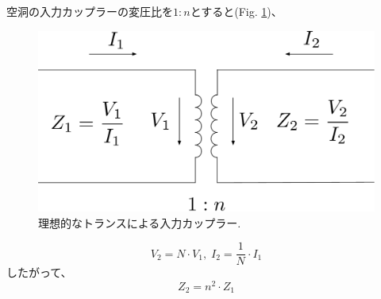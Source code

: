 \documentclass[book]{jlreq}
\begin{document}
空洞の入力カップラーの変圧比を$1:n$とすると(Fig. \ref{fig:Ideal_Trans})、
%
\begin{figure}[hbt]
    \begin{center}
        \includegraphics[width=12cm,clip]{figs/Ideal_Transformer.pdf}
        \caption{理想的なトランスによる入力カップラー.}
        \label{fig:Ideal_Trans}
    \end{center}
\end{figure}
%
\begin{equation}
    V_2 = N\cdot V_1, \; I_2 = \frac{1}{N}\cdot I_1
\end{equation}
%
したがって、
\begin{equation}
    Z_2 = n^2 \cdot Z_1
\end{equation}
\end{document}
